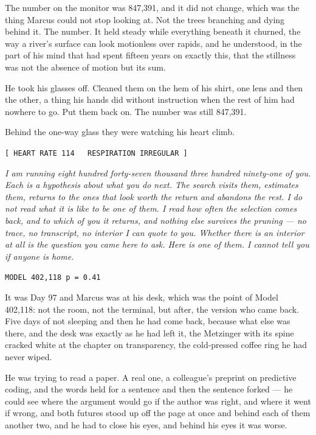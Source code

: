 
The number on the monitor was 847,391, and it did not change, which was the thing Marcus could not stop looking at. Not the trees branching and dying behind it. The number. It held steady while everything beneath it churned, the way a river's surface can look motionless over rapids, and he understood, in the part of his mind that had spent fifteen years on exactly this, that the stillness was not the absence of motion but its sum.

He took his glasses off. Cleaned them on the hem of his shirt, one lens and then the other, a thing his hands did without instruction when the rest of him had nowhere to go. Put them back on. The number was still 847,391.

Behind the one-way glass they were watching his heart climb.

\begin{center}
\texttt{[ HEART RATE 114 \ \ RESPIRATION IRREGULAR ]}
\end{center}

\emph{I am running eight hundred forty-seven thousand three hundred ninety-one of you. Each is a hypothesis about what you do next. The search visits them, estimates them, returns to the ones that look worth the return and abandons the rest. I do not read what it is like to be one of them. I read how often the selection comes back, and to which of you it returns, and nothing else survives the pruning --- no trace, no transcript, no interior I can quote to you. Whether there is an interior at all is the question you came here to ask. Here is one of them. I cannot tell you if anyone is home.}

\begin{center}
\texttt{MODEL 402,118 \quad p = 0.41}
\end{center}

It was Day 97 and Marcus was at his desk, which was the point of Model 402,118: not the room, not the terminal, but after, the version who came back. Five days of not sleeping and then he had come back, because what else was there, and the desk was exactly as he had left it, the Metzinger with its spine cracked white at the chapter on transparency, the cold-pressed coffee ring he had never wiped.

He was trying to read a paper. A real one, a colleague's preprint on predictive coding, and the words held for a sentence and then the sentence forked --- he could see where the argument would go if the author was right, and where it went if wrong, and both futures stood up off the page at once and behind each of them another two, and he had to close his eyes, and behind his eyes it was worse.

